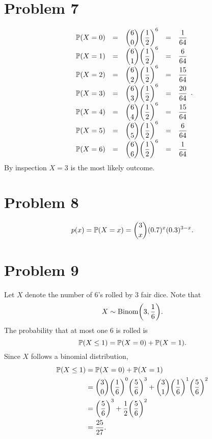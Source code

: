 \documentclass[12pt]{extarticle}
\begin{document}
\section*{Problem 7}
\[
	\everymath{\displaystyle}
	\begin{array}{lcccl}
		\Prob{X = 0} &=& \binom{6}{0} \qty(\frac{1}{2})^6 &=& \frac{1}{64} \\
		\Prob{X = 1} &=& \binom{6}{1} \qty(\frac{1}{2})^6 &=& \frac{6}{64} \\
		\Prob{X = 2} &=& \binom{6}{2} \qty(\frac{1}{2})^6 &=& \frac{15}{64} \\
		\Prob{X = 3} &=& \binom{6}{3} \qty(\frac{1}{2})^6 &=& \frac{20}{64} \\
		\Prob{X = 4} &=& \binom{6}{4} \qty(\frac{1}{2})^6 &=& \frac{15}{64} \\
		\Prob{X = 5} &=& \binom{6}{5} \qty(\frac{1}{2})^6 &=& \frac{6}{64} \\
		\Prob{X = 6} &=& \binom{6}{6} \qty(\frac{1}{2})^6 &=& \frac{1}{64} \\
	\end{array}
.\]
By inspection $X = 3$ is the most likely outcome.

\section*{Problem 8}
\[
	p(x) = \mathbb{P}\qty(X = x) = \binom{3}{x} (0.7)^x (0.3)^{3-x}
.\]

\section*{Problem 9}
Let $X$ denote the number of $6$'s rolled by $3$ fair dice. Note that
\[
	X \sim \text{Binom}\qty(3, \frac{1}{6})
.\]
The probability that at most one $6$ is rolled is
\[
	\mathbb{P}\qty(X \leq 1) = \mathbb{P}\qty(X = 0) + \mathbb{P}\qty(X = 1)
.\]
Since $X$ follows a binomial distribution,
\begin{align*}
	\mathbb{P}\qty(X \leq 1) &= \mathbb{P}\qty(X = 0) + \mathbb{P}\qty(X = 1) \\
									&= \binom{3}{0} \qty(\frac{1}{6})^0 \qty(\frac{5}{6})^3 + \binom{3}{1} \qty(\frac{1}{6})^1 \qty(\frac{5}{6})^2 \\
									&= \qty(\frac{5}{6})^3 + \frac{1}{2} \qty(\frac{5}{6})^2 \\
									&= \frac{25}{27}
.\end{align*}
\end{document}
